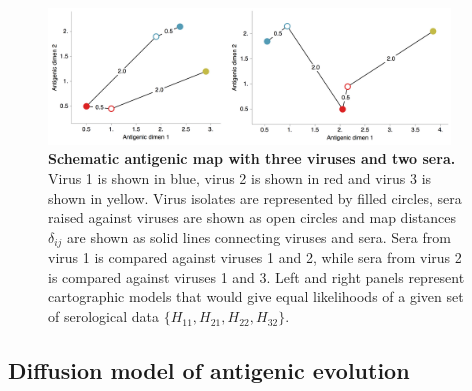 \documentclass[11pt,oneside,letterpaper]{article}
\begin{document}
\begin{figure}[tb]
	\centering		
	\includegraphics[width=0.95\textwidth]{figures/schematic_map}
	\caption{\textbf{Schematic antigenic map with three viruses and two sera.} 
	Virus 1 is shown in blue, virus 2 is shown in red and virus 3 is shown in yellow.
	Virus isolates are represented by filled circles, sera raised against viruses are shown as open circles and map distances $\delta_{ij}$ are shown as solid lines connecting viruses and sera.
	Sera from virus 1 is compared against viruses 1 and 2, while sera from virus 2 is compared against viruses 1 and 3.
	Left and right panels represent cartographic models that would give equal likelihoods of a given set of serological data $\{H_{11},H_{21},H_{22},H_{32}\}$.
	} 
	\label{schematic_map} 
\end{figure}

\subsection*{Diffusion model of antigenic evolution}
\end{document}
